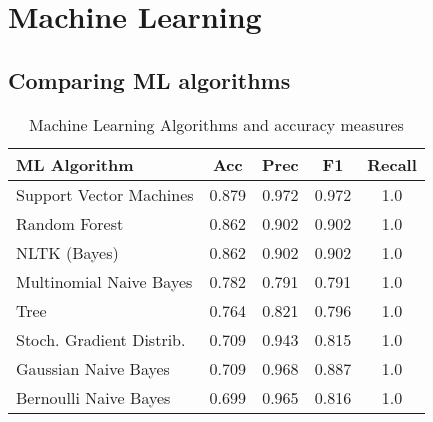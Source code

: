 \documentclass[a4paper]{article}
\begin{document}
\section{Machine Learning}
\label{sec:ml}

\subsection{Comparing ML algorithms}

\begin{table}
\footnotesize
\center
\begin{tabular}[]{lcccc}
  \hline
  ML Algorithm & Acc & Prec & F1 & Recall \tabularnewline
  \hline
 Support Vector Machines             &    0.879 &     0.972 &   0.972 &    1.0  \tabularnewline
 Random Forest                       &    0.862 &     0.902 &   0.902 &    1.0  \tabularnewline
 NLTK (Bayes)                        &    0.862 &     0.902 &   0.902 &    1.0  \tabularnewline
 Multinomial Naive Bayes             &    0.782 &     0.791 &   0.791 &    1.0  \tabularnewline
 Tree                                &    0.764 &     0.821 &   0.796 &    1.0  \tabularnewline
 Stoch. Gradient Distrib.            &    0.709 &     0.943 &   0.815 &    1.0  \tabularnewline
 Gaussian Naive Bayes                &    0.709 &     0.968 &   0.887 &    1.0  \tabularnewline
 Bernoulli Naive Bayes               &    0.699 &     0.965 &   0.816 &    1.0  \tabularnewline
\hline
\end{tabular}
\caption{Machine Learning Algorithms and accuracy measures}
\label{table:MLAccuracies}
\end{table}
\end{document}
